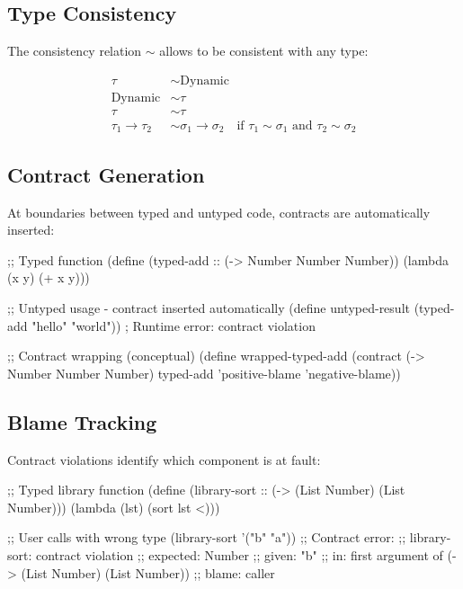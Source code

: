 
\subsection{Type Consistency}
\label{subsec:consistency}

The consistency relation $\sim$ allows  to be consistent with any type:

\begin{align}
\tau &\sim \text{Dynamic} \\
\text{Dynamic} &\sim \tau \\
\tau &\sim \tau \\
\tau_1 \to \tau_2 &\sim \sigma_1 \to \sigma_2 \quad \text{if } \tau_1 \sim \sigma_1 \text{ and } \tau_2 \sim \sigma_2
\end{align}

\subsection{Contract Generation}
\label{subsec:contracts}

At boundaries between typed and untyped code, contracts are automatically inserted:

\begin{example}
\begin{lambdustcode}
;; Typed function
(define (typed-add :: (-> Number Number Number))
  (lambda (x y) (+ x y)))

;; Untyped usage - contract inserted automatically
(define untyped-result 
  (typed-add "hello" "world"))  ; Runtime error: contract violation

;; Contract wrapping (conceptual)
(define wrapped-typed-add
  (contract (-> Number Number Number)
            typed-add
            'positive-blame
            'negative-blame))
\end{lambdustcode}
\end{example}

\subsection{Blame Tracking}
\label{subsec:blame}

Contract violations identify which component is at fault:

\begin{example}
\begin{lambdustcode}
;; Typed library function
(define (library-sort :: (-> (List Number) (List Number)))
  (lambda (lst) (sort lst <)))

;; User calls with wrong type
(library-sort '("b" "a"))  
;; Contract error: 
;; library-sort: contract violation
;; expected: Number
;; given: "b"  
;; in: first argument of (-> (List Number) (List Number))
;; blame: caller
\end{lambdustcode}
\end{example}

